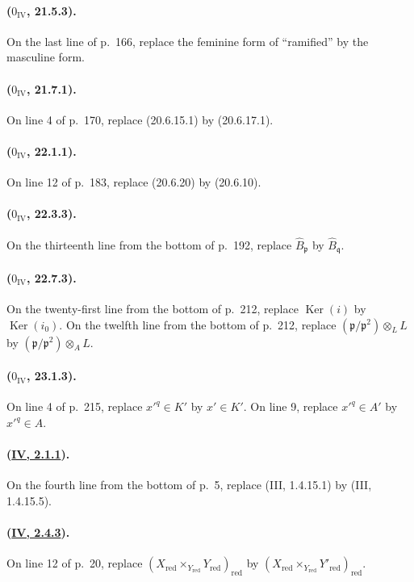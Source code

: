 \paragraph{($0_{\mathrm{IV}}$, 21.5.3).}
On the last line of p.~166, replace the feminine form of ``ramified'' by
the masculine form.

\paragraph{($0_{\mathrm{IV}}$, 21.7.1).}
On line 4 of p.~170, replace (20.6.15.1) by (20.6.17.1).

\paragraph{($0_{\mathrm{IV}}$, 22.1.1).}
On line 12 of p.~183, replace (20.6.20) by (20.6.10).

\paragraph{($0_{\mathrm{IV}}$, 22.3.3).}
On the thirteenth line from the bottom of p.~192, replace
$\widehat B_{\mathfrak p}$ by $\widehat B_{\mathfrak q}$.

\paragraph{($0_{\mathrm{IV}}$, 22.7.3).}
On the twenty-first line from the bottom of p.~212, replace
$\operatorname{Ker}(i)$ by $\operatorname{Ker}(i_0)$.  On the twelfth
line from the bottom of p.~212, replace
$(\mathfrak p/\mathfrak p^2)\otimes_L L$ by
$(\mathfrak p/\mathfrak p^2)\otimes_A L$.

\paragraph{($0_{\mathrm{IV}}$, 23.1.3).}
On line 4 of p.~215, replace $x'^q\in K'$ by $x'\in K'$.  On line 9,
replace $x'^q\in A'$ by $x'^q\in A$.

\paragraph{({\texorpdfstring{\protect\hyperlink{ega4.c04.statement.2-1-1}{IV, 2.1.1}}{IV, 2.1.1}}).}
On the fourth line from the bottom of p.~5, replace (III, 1.4.15.1) by
(III, 1.4.15.5).

\paragraph{({\texorpdfstring{\protect\hyperlink{ega4.c04.prop.2-4-3}{IV, 2.4.3}}{IV, 2.4.3}}).}
On line 12 of p.~20, replace
$(X_{\mathrm{red}}\times_{Y_{\mathrm{red}}}Y_{\mathrm{red}})_{\mathrm{red}}$
by
$(X_{\mathrm{red}}\times_{Y_{\mathrm{red}}}Y'_{\mathrm{red}})_{\mathrm{red}}$.

